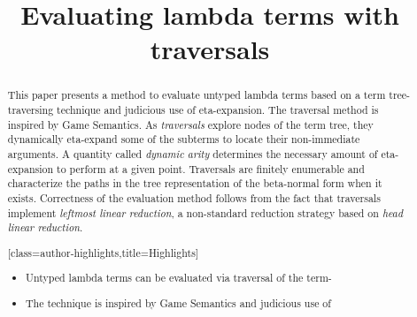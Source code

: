 \documentclass[xchauthor,chkrefs,GCNS,amsmath,amsthm,rotating,leaveRGB]{tcsg}
\theoremstyle{plain}
\theoremstyle{definition}
\begin{document}
\begin{frontmatter}
\title{Evaluating lambda terms with traversals}
\begin{aug}
\author{ }
\address{%
,
,
,
, ,
%
}
\end{aug}
%
%
%
%
%
%
%
\begin{abstract}        %
This paper presents a method to evaluate untyped lambda terms based on a term tree-traversing
technique and judicious use of eta-expansion.
 The traversal method is inspired by Game Semantics.
As
\emph{traversals} explore nodes of the term tree, they dynamically
eta-expand some of the subterms to locate their non-immediate
arguments. A quantity called \emph{dynamic arity} determines the necessary
amount of eta-expansion to perform at a given point. Traversals are
finitely enumerable and characterize the paths in the tree representation
of the beta-normal form when it exists. Correctness of the evaluation
method follows from the fact that traversals implement \emph{leftmost
linear reduction}, a non-standard reduction strategy based on \emph{head
linear reduction}.
\end{abstract}
\begin{abstract}[class=author-highlights,title=Highlights]
%
\begin{itemize}
\item Untyped lambda terms can be evaluated via traversal of the
    term-
\item The technique is inspired by Game Semantics and judicious use of

\end{itemize}
\end{abstract}
\end{frontmatter}
\end{document}
